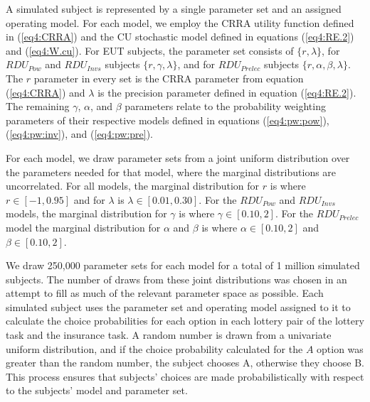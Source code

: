 \documentclass[../main.tex]{subfiles}
\begin{document}
A simulated subject is represented by a single parameter set and an assigned operating model.
For each model, we employ the CRRA utility function defined in (\ref{eq4:CRRA}) and the CU stochastic model defined in equations (\ref{eq4:RE.2}) and (\ref{eq4:W.cu}).
For EUT subjects, the parameter set consists of $\lbrace r, \lambda \rbrace$, for $\mathit{RDU_{Pow}}$ and $\mathit{RDU_{Invs}}$ subjects $\lbrace r, \gamma, \lambda \rbrace$, and for $\mathit{RDU_{Prelec}}$ subjects $\lbrace r, \alpha, \beta, \lambda \rbrace$.
The $r$ parameter in every set is the CRRA parameter from equation (\ref{eq4:CRRA}) and $\lambda$ is the precision parameter defined in equation (\ref{eq4:RE.2}).
The remaining $\gamma$, $\alpha$, and $\beta$ parameters relate to the probability weighting parameters of their respective models defined in equations (\ref{eq4:pw:pow}), (\ref{eq4:pw:inv}), and (\ref{eq4:pw:pre}).

For each model, we draw parameter sets from a joint uniform distribution over the parameters needed for that model, where the marginal distributions are uncorrelated.{\footnotemark}
For all models, the marginal distribution for $r$ is where $r \in [-1, 0.95]$ and  for $\lambda$ is $\lambda \in [0.01, 0.30]$.
For the $\mathit{RDU_{Pow}}$ and $\mathit{RDU_{Invs}}$ models, the marginal distribution for $\gamma$ is where $\gamma \in [0.10, 2]$.
For the $\mathit{RDU_{Prelec}}$ model the marginal distribution for $\alpha$ and $\beta$ is where $\alpha \in [0.10, 2]$ and $\beta \in [0.10, 2]$.

We draw 250,000 parameter sets for each model for a total of 1 million simulated subjects.
The number of draws from these joint distributions was chosen in an attempt to fill as much of the relevant parameter space as possible.{\footnotemark}
Each simulated subject uses the parameter set and operating model assigned to it to calculate the choice probabilities for each option in each lottery pair of the lottery task and the insurance task.
A random number is drawn from a univariate uniform distribution, and if the choice probability calculated for the $A$ option was greater than the random number, the subject chooses A, otherwise they choose B.
This process ensures that subjects' choices are made probabilistically with respect to the subjects' model and parameter set.{\footnotemark}
\end{document}
